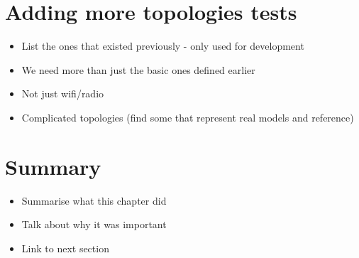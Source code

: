 \section{Adding more topologies tests}
\begin{itemize}
    \item List the ones that existed previously - only used for development
    \item We need more than just the basic ones defined earlier
    \item Not just wifi/radio
    \item Complicated topologies (find some that represent real models and reference)
\end{itemize}

\section{Summary}
\begin{itemize}
    \item Summarise what this chapter did
    \item Talk about why it was important
    \item Link to next section
\end{itemize}
